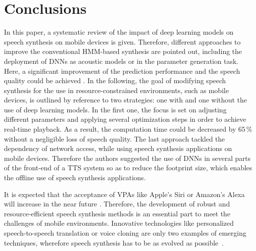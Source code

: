 

\section{Conclusions}
\label{sec:conclusion}

In this paper, a systematic review of the impact of deep learning models on speech synthesis on mobile devices is given. Therefore, different approaches to improve the conventional \ac{HMM}-based synthesis are pointed out, including the deployment of \acp{DNN} as acoustic models or in the parameter generation task. Here, a significant improvement of the prediction performance and the speech quality could be achieved \cite{zen:deepstatistical, hashimoto:effect}. In the following, the goal of modifying speech synthesis for the use in resource-constrained environments, such as mobile devices, is outlined by reference to two strategies: one with and one without the use of deep learning models. In the first one, the focus is set on adjusting different parameters and applying several optimization steps \cite{toth:optimizing} in order to achieve real-time playback. As a result, the computation time could be decreased by 65\,\% without a negligible loss of speech quality. The last approach \cite{boros:robust} tackled the dependency of network access, while using speech synthesis applications on mobile devices. Therefore the authors suggested the use of \acp{DNN} in several parts of the front-end of a \ac{TTS} system so as to reduce the footprint size, which enables the offline use of speech synthesis applications.

It is expected that the acceptance of \acp{VPA} like Apple's Siri or Amazon's Alexa will increase in the near future \cite{gartner:assistants}. Therefore, the development of robust and resource-efficient speech synthesis methods is an essential part to meet the challenges of mobile environments. Innovative technologies like personalized speech-to-speech translation or voice cloning are only two examples of emerging techniques, wherefore speech synthesis has to be as evolved as possible~\cite{edinburgh:speech}.